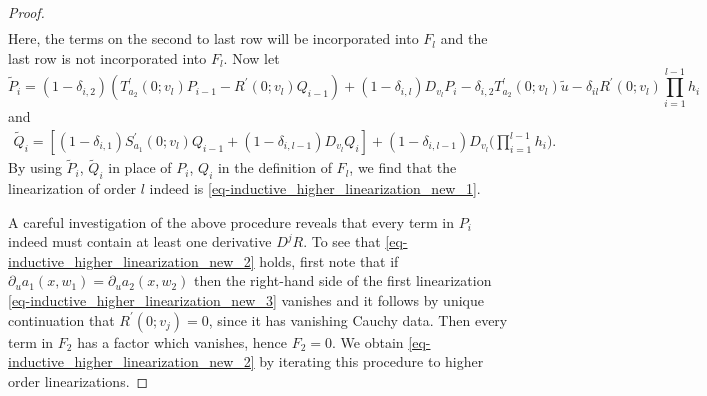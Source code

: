 \documentclass[10pt,a4paper]{amsart}
\begin{document}
\begin{proof}
\begin{equation*}
\begin{aligned}
\end{aligned}
\end{equation*}
Here, the terms on the second to last row will be incorporated into \( F_{l} \) and the last row is not incorporated into \( F_{l} \).
Now let
\begin{equation*}
	\tilde{P}_{i} = (1-\delta_{i,2})(T_{a_{2}}^{\prime}(0;v_{l})P_{i-1} - R^{\prime}(0;v_{l})Q_{i-1}) + (1-\delta_{i,l})D_{v_{l}}P_{i} - \delta_{i,2}T_{a_{2}}^{\prime}(0;v_{l})\tilde{u}-\delta_{il}R^{\prime}(0;v_{l})\prod_{i=1}^{l-1}h_{i}
\end{equation*}
and
\begin{equation*}
\begin{aligned}
	\tilde{Q}_{i} = [(1-\delta_{i,1})S_{a_{1}}^{\prime}(0;v_{l})Q_{i-1} + (1-\delta_{i,l-1})D_{v_{l}}Q_{i}] + (1-\delta_{i,l-1})D_{v_{l}}\Big(\prod_{i=1}^{l-1}h_{i}\Big).
\end{aligned}
\end{equation*}
By using \( \tilde{P}_{i} \), \( \tilde{Q}_{i} \) in place of \( P_{i} \), \( Q_{i} \) in the definition of \( F_{l} \), we find that the linearization of order \( l \) indeed is \eqref{eq-inductive_higher_linearization_new_1}.

A careful investigation of the above procedure reveals that every term in \( P_{i} \) indeed must contain at least one derivative \( D^{j}R \).
To see that \eqref{eq-inductive_higher_linearization_new_2} holds, first note that if \( \partial_{u}a_{1}(x,w_{1}) = \partial_{u}a_{2}(x,w_{2}) \) then the right-hand side of the first linearization \eqref{eq-inductive_higher_linearization_new_3} vanishes and it follows by unique continuation that \( R^{\prime}(0;v_{j}) = 0 \), since it has vanishing Cauchy data.
Then every term in \( F_{2} \) has a factor which vanishes, hence \( F_{2} = 0 \).
We obtain \eqref{eq-inductive_higher_linearization_new_2} by iterating this procedure to higher order linearizations.
\end{proof}
\end{document}
